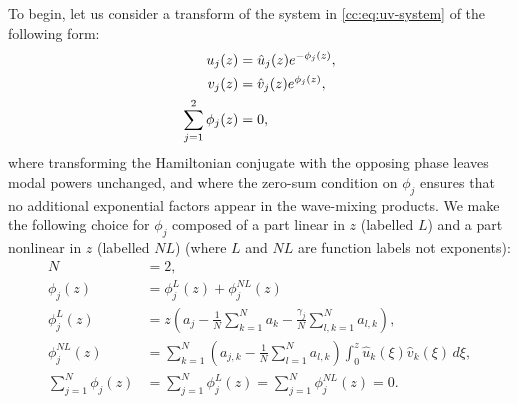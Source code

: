 \documentclass[11pt,a4paper]{article}
\numberwithin{equation}{section}
\begin{document}
To begin, let us consider a transform of the system in \eqref{cc:eq:uv-system} of the following form:
\begin{align}
u_j(z) &= \hat{u}_j(z) e^{- \phi_j(z)}, \notag \\
v_j(z) &= \hat{v}_j(z) e^{\phi_j(z)}, \\ 
\sum_{j=1}^{2} \phi_j(z) &= 0,
\end{align}
where transforming the Hamiltonian conjugate with the opposing phase leaves modal powers unchanged, and where the zero-sum condition on $\phi_j$ ensures that no additional exponential factors appear in the wave-mixing products.
We make the following choice for $\phi_j$ composed of a part linear in $z$ (labelled $L$) and a part nonlinear in $z$ (labelled $NL$) (where $L$ and $NL$ are function labels not exponents):
\begin{align}
N &= 2, \\
\phi_j(z) &= \phi_j^{L}(z) + \phi_j^{NL}(z) \\
\phi_j^{L}(z) &= z\left({a}_{j} - \frac{1}{N}\sum_{k=1}^{N} a_{k} - \frac{{\gamma}_{j}}{N} \sum\limits_{l,k=1}^{N} a_{l,k}\right), \\
\phi_j^{NL}(z)  &= \sum_{k=1}^{N} \left({a}_{j,k} - \frac{1}{N}\sum_{l=1}^{N} {a}_{l,k}\right) \int_0^z \hat{u}_k (\xi) \hat{v}_k (\xi) \, d\xi, \\
\sum_{j=1}^{N} \phi_j(z) &= \sum_{j=1}^{N} \phi_j^{L}(z) = \sum_{j=1}^{N} \phi_j^{NL}(z) =0.
\end{align}
\end{document}
